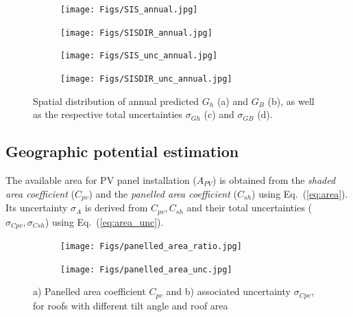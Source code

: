 \begin{figure}[tb]
\centering
\begin{subfigure}{.49\textwidth}
  \centering
  \texttt{[image: Figs/SIS\_annual.jpg]}  
  \subcaption{}
\end{subfigure}
\begin{subfigure}{.49\textwidth}
  \centering
  \texttt{[image: Figs/SISDIR\_annual.jpg]}  
  \subcaption{}
\end{subfigure}
\begin{subfigure}{.49\textwidth}
  \centering
  \texttt{[image: Figs/SIS\_unc\_annual.jpg]} 
  \subcaption{}
\end{subfigure}
\begin{subfigure}{.49\textwidth}
  \centering
  \texttt{[image: Figs/SISDIR\_unc\_annual.jpg]}  
  \subcaption{}
\end{subfigure}
\caption{Spatial distribution of annual predicted $G_h$ (a) and $G_B$ (b), as well as the respective total uncertainties $\sigma_{Gh}$ (c) and $\sigma_{GB}$ (d).}
\label{fig:Gh_GB}
\end{figure}


\subsection{Geographic potential estimation}
\label{geo}


The available area for PV panel installation ($A_{PV}$) is obtained from the \textit{shaded area coefficient} ($C_{pv}$) and the \textit{panelled area coefficient} ($C_{sh}$) using Eq.~(\ref{eq:area}). Its uncertainty $\sigma_{A}$ is derived from $C_{pv}, C_{sh}$ and their total uncertainties ($\sigma_{Cpv}, \sigma_{Csh}$) using Eq.~(\ref{eq:area_unc}).

\begin{figure}[tb]
\centering
\begin{subfigure}{.49\textwidth}
  \centering
  \texttt{[image: Figs/panelled\_area\_ratio.jpg]}
  \subcaption{}
\end{subfigure}
\begin{subfigure}{.49\textwidth}
  \centering
  \texttt{[image: Figs/panelled\_area\_unc.jpg]}  
  \subcaption{}
\end{subfigure}
\caption{a) Panelled area coefficient $C_{pv}$ and b) associated uncertainty $\sigma_{Cpv}$, for roofs with different tilt angle and roof area}
\label{fig:C_pv}
\end{figure}

